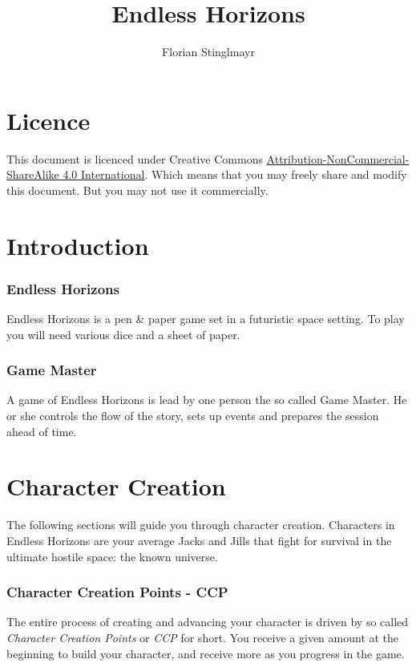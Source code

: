 \documentclass[11pt,a4paper,openany]{scrbook}
\begin{document}
\title{Endless Horizons}
\author{Florian Stinglmayr}
\maketitle

\chapter{Licence}

  This document is licenced under Creative Commons
  \href{http://creativecommons.org/licenses/by-nc-sa/4.0/}
       {Attribution-NonCommercial-ShareAlike 4.0 International}.
  Which means that you may freely share and modify this document.
  But you may not use it commercially.

\chapter{Introduction}

\subsection{Endless Horizons}

Endless Horizons is a pen \& paper game set in a futuristic space setting. To
play you will need various dice and a sheet of paper.

\subsection{Game Master}

A game of Endless Horizons is lead by one person the so called Game Master.
He or she controls the flow of the story, sets up events and prepares the
session ahead of time.

\chapter{Character Creation}

The following sections will guide you through character creation. Characters
in Endless Horizons are your average Jacks and Jills that fight for survival
in the ultimate hostile space: the known universe.

\subsection{Character Creation Points - CCP}

The entire process of creating and advancing your character is driven by so
called \emph{Character Creation Points} or \emph{CCP} for short. You receive
a given amount at the beginning to build your character, and receive more as
you progress in the game.
\end{document}
